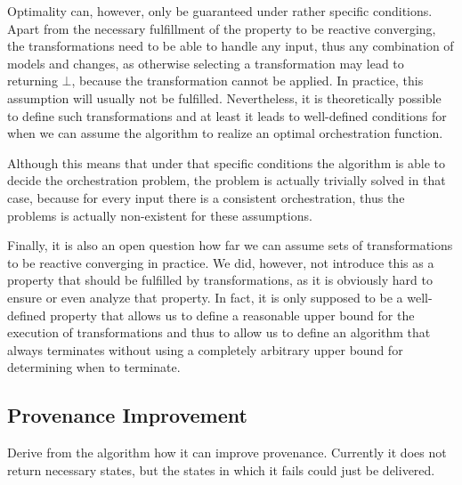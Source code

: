 Optimality can, however, only be guaranteed under rather specific conditions.
Apart from the necessary fulfillment of the property to be reactive converging, the transformations need to be able to handle any input, thus any combination of models and changes, as otherwise selecting a transformation may lead to  returning $\bot$, because the transformation cannot be applied.
In practice, this assumption will usually not be fulfilled.
Nevertheless, it is theoretically possible to define such transformations and at least it leads to well-defined conditions for when we can assume the algorithm to realize an optimal orchestration function.

Although this means that under that specific conditions the algorithm is able to decide the orchestration problem, the problem is actually trivially solved in that case, because for every input there is a consistent orchestration, thus the problems is actually non-existent for these assumptions.

Finally, it is also an open question how far we can assume sets of transformations to be reactive converging in practice.
We did, however, not introduce this as a property that should be fulfilled by transformations, as it is obviously hard to ensure or even analyze that property.
In fact, it is only supposed to be a well-defined property that allows us to define a reasonable upper bound for the execution of transformations and thus to allow us to define an algorithm that always terminates without using a completely arbitrary upper bound for determining when to terminate.


\subsection{Provenance Improvement}

Derive from the algorithm how it can improve provenance.
Currently it does not return necessary states, but the states in which it fails could just be delivered.



